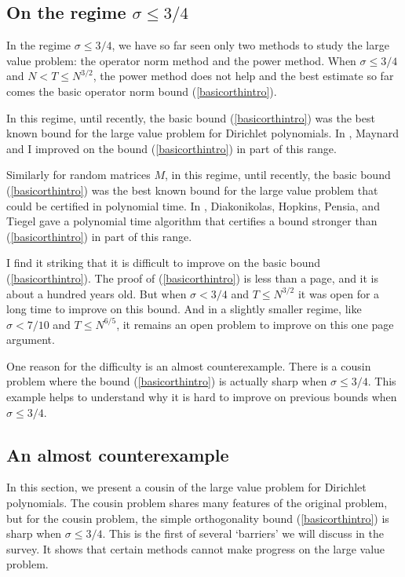 \documentclass{amsart}
\begin{document}
\subsection{On the regime $\sigma \le 3/4$}

In the regime $\sigma \le 3/4$,  we have so far seen only two methods to study the large value problem: the operator norm method and the power method.  When  
 $\sigma \le 3/4$ and  $N < T \le N^{3/2}$,  the power method does not help and the best estimate so far comes the basic operator norm bound  (\ref{basicorthintro}).
 
In this regime, until recently, the basic bound (\ref{basicorthintro}) was the best known bound for the large value problem for Dirichlet polynomials.  In \cite{GM}, Maynard and I improved on the bound (\ref{basicorthintro}) in part of this range.

Similarly for random matrices $M$, in this regime, until recently, the basic bound (\ref{basicorthintro}) was the best known bound for the large value problem that could be certified in polynomial time.  In \cite{DHPT}, 
 Diakonikolas, Hopkins, Pensia, and Tiegel gave a polynomial time algorithm that certifies a bound stronger than (\ref{basicorthintro}) in part of this range.
 
  I find it striking that it is difficult to improve on the basic bound (\ref{basicorthintro}).  The proof of  (\ref{basicorthintro}) is less than a page, and it is about a hundred years old.  
 But when $\sigma < 3/4$ and $T \le N^{3/2}$ it was open for a long time to improve on this bound.  And in a slightly smaller regime, like $\sigma < 7/10$ and $T \le N^{6/5}$, it remains an open problem to improve on this one page argument.

 One reason for the difficulty is an almost counterexample.  There is a cousin problem where the bound (\ref{basicorthintro}) is actually sharp when $\sigma \le 3/4$.   This example helps to understand why it is hard to improve on previous bounds when $\sigma \le 3/4$.   

\subsection{An almost counterexample} \label{subsecac}

In this section,  we present a cousin of the large value problem for Dirichlet polynomials.   The cousin problem shares many features of the original problem,  but for the cousin problem,  the simple orthogonality bound (\ref{basicorthintro}) is sharp when $\sigma \le 3/4$.   This is the first of several `barriers' we will discuss in the survey.   It shows that certain methods cannot make progress on the large value problem.
\end{document}
